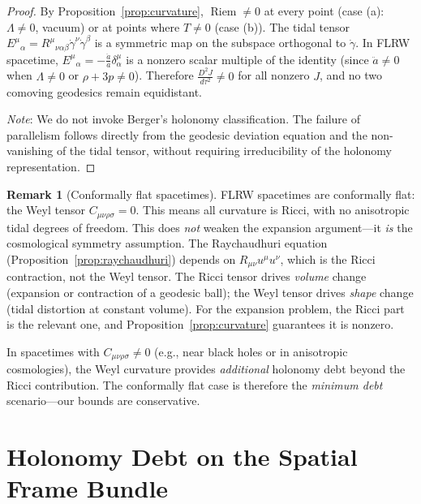 \documentclass[12pt]{amsart}
\theoremstyle{definition}
\newtheorem{remark}[theorem]{Remark}
\newcommand{\Riem}{\operatorname{Riem}}
\begin{document}
\begin{proof}
By Proposition~\ref{prop:curvature}, $\Riem \neq 0$ at every point (case (a): $\Lambda \neq 0$, vacuum) or at points where $T \neq 0$ (case (b)).  The tidal tensor $E^\mu{}_\alpha = R^\mu{}_{\nu\alpha\beta}\dot\gamma^\nu \dot\gamma^\beta$ is a symmetric map on the subspace orthogonal to $\dot\gamma$.  In FLRW spacetime, $E^\mu{}_\alpha = -\frac{\ddot a}{a}\delta^\mu_\alpha$ is a nonzero scalar multiple of the identity (since $\ddot a \neq 0$ when $\Lambda \neq 0$ or $\rho + 3p \neq 0$).  Therefore $\frac{D^2 J}{d\tau^2} \neq 0$ for all nonzero $J$, and no two comoving geodesics remain equidistant.

\emph{Note}: We do not invoke Berger's holonomy classification.  The failure of parallelism follows directly from the geodesic deviation equation and the non-vanishing of the tidal tensor, without requiring irreducibility of the holonomy representation.
\end{proof}

\begin{remark}[Conformally flat spacetimes]
\label{rmk:weyl}
FLRW spacetimes are conformally flat: the Weyl tensor $C_{\mu\nu\rho\sigma} = 0$.  This means all curvature is Ricci, with no anisotropic tidal degrees of freedom.  This does \emph{not} weaken the expansion argument---it \emph{is} the cosmological symmetry assumption.  The Raychaudhuri equation (Proposition~\ref{prop:raychaudhuri}) depends on $R_{\mu\nu}u^\mu u^\nu$, which is the Ricci contraction, not the Weyl tensor.  The Ricci tensor drives \emph{volume} change (expansion or contraction of a geodesic ball); the Weyl tensor drives \emph{shape} change (tidal distortion at constant volume).  For the expansion problem, the Ricci part is the relevant one, and Proposition~\ref{prop:curvature} guarantees it is nonzero.

In spacetimes with $C_{\mu\nu\rho\sigma} \neq 0$ (e.g., near black holes or in anisotropic cosmologies), the Weyl curvature provides \emph{additional} holonomy debt beyond the Ricci contribution.  The conformally flat case is therefore the \emph{minimum debt} scenario---our bounds are conservative.
\end{remark}


\section{Holonomy Debt on the Spatial Frame Bundle}
\end{document}
